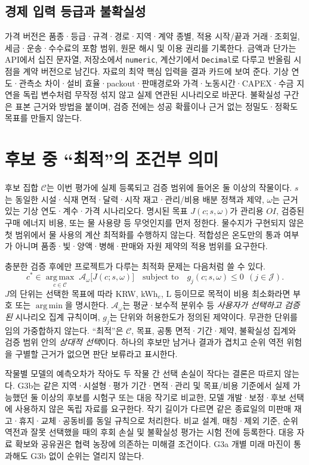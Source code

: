 \documentclass[11pt,a4paper]{article}
\newcommand{\hold}{\textsf{판단 보류}}
\begin{document}
\subsection{경제 입력 등급과 불확실성}
가격 버전은 품종·등급·규격·경로·지역·계약 종별, 적용 시작/끝과 거래·조회일, 세금·운송·수수료의 포함 범위, 원문 해시 및 이용 권리를 기록한다. 금액과 단가는 API에서 십진 문자열, 저장소에서 \texttt{numeric}, 계산기에서 \texttt{Decimal}로 다루고 반올림 시점을 계약 버전으로 남긴다. 자료의 최약 핵심 입력을 결과 카드에 보여 준다. 기상 연도·관측소 차이·설비 효율·packout·판매경로와 가격·노동시간·CAPEX·수금 지연을 독립 변수처럼 무작정 섞지 않고 실제 연관된 시나리오로 바꾼다. 불확실성 구간은 표본 근거와 방법을 붙이며, 검증 전에는 성공 확률이나 근거 없는 정밀도·정확도 목표를 만들지 않는다.

\section{후보 중 ``최적''의 조건부 의미}
후보 집합 $\mathcal C$는 이번 평가에 실제 등록되고 검증 범위에 들어온 둘 이상의 작물이다. $s$는 동일한 시설·식재 면적·달력·시작 재고·관리/비용 배분 정책과 제약, $\omega$는 근거 있는 기상 연도·계수·가격 시나리오다. 명시된 목표 $J(c;s,\omega)$가 관리용 $OI$, 검증된 구매 에너지 비용, 또는 물 사용량 등 무엇인지를 먼저 정한다. 물수지가 구현되지 않은 첫 범위에서 물 사용의 계산 최적화를 수행하지 않는다. 적합성은 온도만의 통과 여부가 아니며 품종·빛·양액·병해·판매와 자원 제약의 적용 범위를 요구한다.

충분한 검증 후에만 프로젝트가 다루는 최적화 문제는 다음처럼 쓸 수 있다.
\begin{equation}
c^*\in\underset{c\in\mathcal C}{\operatorname{arg\,max}}\;\mathcal{A}_{\omega}
\bigl[J(c;s,\omega)\bigr]
\quad\text{subject to}\quad
g_j(c;s,\omega)\leq 0\ \ (j\in\mathcal J).\label{eq:choice}
\end{equation}
$J$의 단위는 선택한 목표에 따라 KRW, kWh$_e$, L 등이므로 목적이 비용 최소화라면 부호 또는 \(\operatorname{arg\,min}\)을 명시한다. $\mathcal A_\omega$는 평균·보수적 분위수 등 \emph{사용자가 선택하고 검증된} 시나리오 집계 규칙이며, $g_j$는 단위와 허용한도가 정의된 제약이다. 무관한 단위를 임의 가중합하지 않는다. ``최적''은 $\mathcal C$, 목표, 공통 면적·기간·제약, 불확실성 집계와 검증 범위 안의 \emph{상대적 선택}이다. 하나의 후보만 남거나 결과가 겹치고 순위 역전 위험을 구별할 근거가 없으면 \hold 라고 표시한다.

작물별 모델의 예측오차가 작아도 두 작물 간 선택 손실이 작다는 결론은 따르지 않는다. G3b는 같은 지역·시설형·평가 기간·면적·관리 및 목표/비용 기준에서 실제 가능했던 둘 이상의 후보를 시험구 또는 대응 작기로 비교한, 모델 개발·보정·후보 선택에 사용하지 않은 독립 자료를 요구한다. 작기 길이가 다르면 같은 종료일의 미판매 재고·휴지·교체·공동비를 동일 규칙으로 처리한다. 비교 설계, 매칭·제외 기준, 순위 역전과 잘못 선택했을 때의 후회 손실 및 불확실성 평가는 시험 전에 등록한다. 대응 자료 확보와 공유권은 협력 농장에 의존하는 미해결 조건이다. G3a 개별 미래 마진이 통과해도 G3b 없이 순위는 열리지 않는다.
\end{document}
